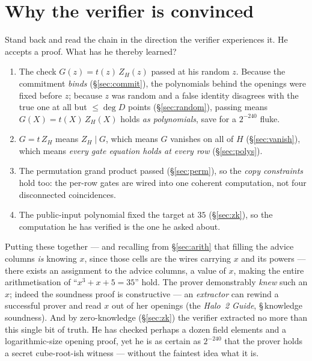 \documentclass[11pt,a4paper]{article}
\theoremstyle{definition}
\newcommand{\ZH}{Z_H}
\DeclareMathOperator{\degr}{deg}
\begin{document}
\section{Why the verifier is convinced}\label{sec:assemble}

Stand back and read the chain in the direction the verifier experiences it. He
accepts a proof. What has he thereby learned?

\begin{enumerate}[leftmargin=*,itemsep=1pt]
\item The check $G(z) = t(z)\,\ZH(z)$ passed at his random $z$. Because the
commitment \emph{binds} (\S\ref{sec:commit}), the polynomials behind the
openings were fixed before $z$; because $z$ was random and a false identity
disagrees with the true one at all but $\le \degr D$ points
(\S\ref{sec:random}), passing means $G(X) = t(X)\,\ZH(X)$ holds \emph{as
polynomials}, save for a $2^{-240}$ fluke.
\item $G = t\,\ZH$ means $\ZH \mid G$, which means $G$ vanishes on all of $H$
(\S\ref{sec:vanish}), which means \emph{every gate equation holds at every
row} (\S\ref{sec:polys}).
\item The permutation grand product passed (\S\ref{sec:perm}), so the
\emph{copy constraints} hold too: the per-row gates are wired into one
coherent computation, not four disconnected coincidences.
\item The public-input polynomial fixed the target at $35$ (\S\ref{sec:zk}), so
the computation he has verified is the one he asked about.
\end{enumerate}
Putting these together --- and recalling from \S\ref{sec:arith} that filling
the advice columns \emph{is} knowing $x$, since those cells are the wires
carrying $x$ and its powers --- there exists an assignment to the advice
columns, a value of $x$, making the entire arithmetisation of
``$x^3 + x + 5 = 35$'' hold. The prover demonstrably \emph{knew} such an $x$; indeed the soundness
proof is constructive --- an \emph{extractor} can rewind a successful prover
and read $x$ out of her openings (the \emph{Halo~2 Guide}, \S\,knowledge
soundness). And by zero-knowledge (\S\ref{sec:zk}) the verifier extracted no
more than this single bit of truth. He has checked perhaps a dozen field
elements and a logarithmic-size opening proof, yet he is as certain as
$2^{-240}$ that the prover holds a secret cube-root-ish witness --- without the
faintest idea what it is.
\end{document}
